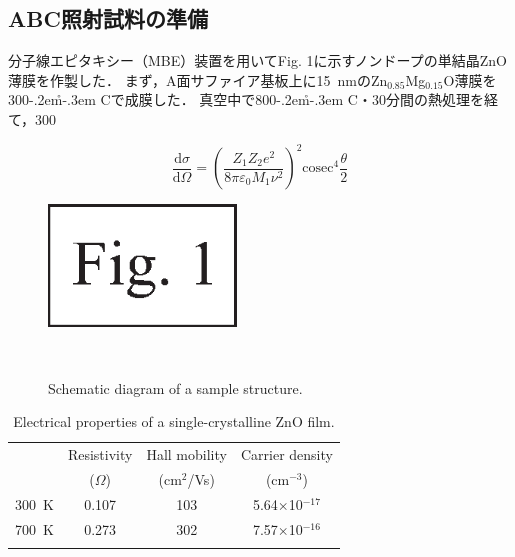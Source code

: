 \documentclass{ujarticle}
\def\HLINE{\noalign{\hrule height1pt}}    %
\def\degC{\kern-.2em\r{}\kern-.3em C}   %
\newenvironment{jsmseq}
{
\vspace*{-1mm}
\begin{flushleft}
\begin{minipage}{0.45\textwidth}
\begin{equation}
}
{
\end{equation}
\end{minipage}
\end{flushleft}
}
\begin{document}
{\begin{multicols}{2}
\section{ABC照射試料の準備}

分子線エピタキシー（MBE）装置を用いてFig. 1に示すノンドープの単結晶ZnO薄膜を作製した．
まず，A面サファイア基板上に15~nmのZn$_{0.85}$Mg$_{0.15}$O薄膜を300\degC で成膜した．
真空中で800\degC ・30分間の熱処理を経て，300

\begin{jsmseq}
	\frac{\mathrm{d}\sigma}{\mathrm{d}\Omega}
	=
	\left(
		\frac{Z_{1}Z_{2}e^{2}}{8\pi\varepsilon_{0}M_{1}\nu^{2}}
	\right)^{2}
	\mathrm{cosec}^{4}\frac{\theta}{2}
\label{eq:1}   %
\end{jsmseq}

\begin{figure}[H]
	\centering\includegraphics[keepaspectratio, width=50mm]{images/Fig1.eps}　%
	\caption{Schematic diagram of a sample structure.}　%
	\label{fig1}  %
\end{figure}

\begin{table}[H]
	\caption{Electrical properties of a single-crystalline ZnO film.}
	\label{table1}
	\begin{center}
		\small
		\begin{tabular}{cccc}
			\HLINE
			& Resistivity & Hall mobility & Carrier density \\ 
			& ($\Omega$) & (cm$^2$/Vs) & (cm$^{-3}$)  \\ 
			\HLINE
			300~K & 0.107 & 103 & 5.64$\times$10$^{-17}$ \\ 
			700~K & 0.273 & 302 & 7.57$\times$10$^{-16}$ \\ 
			\HLINE
		\end{tabular}
	\end{center}
\end{table}


\end{multicols}}
\end{document}
